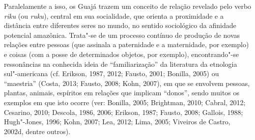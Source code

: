 Paralelamente a isso, os Guajá trazem um conceito de relação revelado
pelo verbo \emph{riku} (ou \emph{ruku}), central em sua socialidade, que
orienta a proximidade e a distância entre diferentes seres no mundo, no
sentido sociológico da afinidade potencial amazônica. Trata"-se de um
processo contínuo de produção de novas relações entre pessoas (que
assinala a paternidade e a maternidade, por exemplo) e coisas (com a
posse de determinados objetos, por exemplo), encontrando"-se ressonâncias
na conhecida ideia de ``familiarização'' da literatura da etnologia
sul"-americana (cf. Erikson, 1987, 2012; Fausto, 2001; Bonilla, 2005) ou
``maestria'' (Costa, 2013; Fausto, 2008; Kohn, 2007), em que se envolvem
pessoas, plantas, animais, espíritos em relações que implicam ``donos'',
sendo muitos os exemplos em que isto ocorre (ver: Bonilla, 2005;
Brightman, 2010; Cabral, 2012; Cesarino, 2010; Descola, 1986, 2006; Erikson,
1987; Fausto, 2008; Gallois, 1988; Hugh"-Jones, 1996; Kohn, 2007; Lea, 2012;
Lima, 2005; Viveiros de Castro, 2002d, dentre outros).

\asterisc

